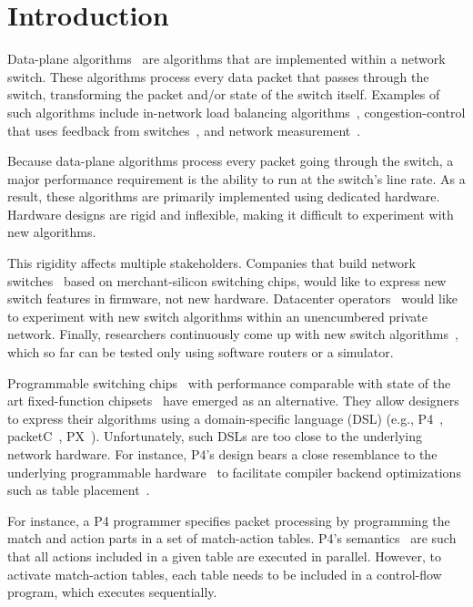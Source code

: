 \section{Introduction}
\label{s:intro}

Data-plane algorithms~\cite{cestan} are algorithms that are implemented within
a network switch. These algorithms process every data packet that passes
through the switch, transforming the packet and/or state of the switch itself.
Examples of such algorithms include in-network load balancing
algorithms~\cite{conga, ecmp}, congestion-control that uses feedback from
switches~\cite{xcp, rcp, pdq, dctcp}, and network measurement~\cite{opensketch,
bitmap_george, elephant_george}.

Because data-plane algorithms process every packet going through the switch, a
major performance requirement is the ability to run at the switch's line rate.
As a result, these algorithms are primarily implemented using dedicated
hardware. Hardware designs are rigid and inflexible, making it difficult to
experiment with new algorithms.

This rigidity affects multiple stakeholders. Companies that build network
switches~\cite{cisco_nexus, dell_force10, arista_7050} based on
merchant-silicon switching chips, would like to express new switch features in
firmware, not new hardware.  Datacenter operators~\cite{google_jupiter,
facebook, vl2, some_amazon_post} would like to experiment with new switch
algorithms within an unencumbered private network.  Finally, researchers
continuously come up with new switch algorithms~\cite{xcp, codel, d3, detail,
pdq}, which so far can be tested only using software routers or a simulator.

Programmable switching chips~\cite{flexpipe, xpliant, rmt} with performance
comparable with state of the art fixed-function chipsets~\cite{trident,
tomahawk, mellanox} have emerged as an alternative.  They allow designers to
express their algorithms using a domain-specific language (DSL) (e.g.,
P4~\cite{p4}, packetC~\cite{packetC}, PX~\cite{PX}).  Unfortunately, such DSLs
are too close to the underlying network hardware.  For instance, P4's design
bears a close resemblance to the underlying programmable
hardware~\cite{flexpipe, rmt} to facilitate compiler backend optimizations such
as table placement~\cite{lavanya_compiler}.

For instance, a P4 programmer specifies packet processing by programming the
match and action parts in a set of match-action tables. P4's
semantics~\cite{p4spec} are such that all actions included in a given table are
executed in parallel. However, to activate match-action tables, each table
needs to be included in a control-flow program, which executes sequentially.

